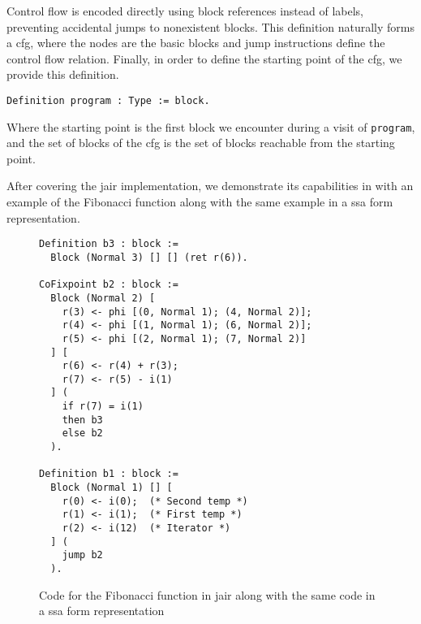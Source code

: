 Control flow is encoded directly using block references instead of labels, preventing accidental jumps to nonexistent blocks. This definition naturally forms a \gls{cfg}, where the nodes are the basic blocks and jump instructions define the control flow relation. Finally, in order to define the starting point of the \gls{cfg}, we provide this definition.

\begin{lstlisting}[style=Rocq]
Definition program : Type := block.
\end{lstlisting}

Where the starting point is the first block we encounter during a visit of \texttt{program}, and the set of blocks of the \gls{cfg} is the set of blocks reachable from the starting point.

After covering the \gls{jair} implementation, we demonstrate its capabilities in  with an example of the Fibonacci function along with the same example in a \gls{ssa} form representation.

\begin{figure}[ht]
\centering
\begin{minipage}{0.65\textwidth}
\begin{lstlisting}[style=Rocq]
Definition b3 : block :=
  Block (Normal 3) [] [] (ret r(6)).

CoFixpoint b2 : block :=
  Block (Normal 2) [
    r(3) <- phi [(0, Normal 1); (4, Normal 2)];
    r(4) <- phi [(1, Normal 1); (6, Normal 2)];
    r(5) <- phi [(2, Normal 1); (7, Normal 2)]
  ] [
    r(6) <- r(4) + r(3);
    r(7) <- r(5) - i(1)
  ] (
    if r(7) = i(1)
    then b3
    else b2
  ).

Definition b1 : block :=
  Block (Normal 1) [] [
    r(0) <- i(0);  (* Second temp *)
    r(1) <- i(1);  (* First temp *)
    r(2) <- i(12)  (* Iterator *)
  ] (
    jump b2
  ).
\end{lstlisting}
\end{minipage}
\hfill
\begin{minipage}{0.30\textwidth}
\centering
{}
\end{minipage}
\caption{Code for the Fibonacci function in \gls{jair} along with the same code in a \gls{ssa} form representation}
\label{fig:example-jair}
\end{figure}

